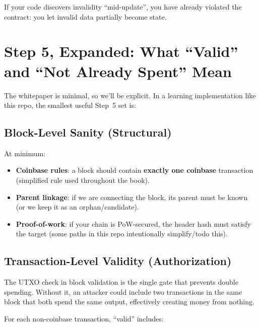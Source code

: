 If your code discovers invalidity ``mid-update'', you have already violated the contract: you let invalid data partially become state.

\section{Step 5, Expanded: What ``Valid'' and ``Not Already Spent'' Mean}
\label{sec:ch10-what-valid-means}

The whitepaper is minimal, so we'll be explicit. In a learning implementation like this repo, the smallest useful Step~5 set is:

\subsection{Block-Level Sanity (Structural)}
\label{sec:ch10-structural}

At minimum:

\begin{itemize}
  \item \textbf{Coinbase rules}: a block should contain \textbf{exactly one coinbase} transaction (simplified rule used throughout the book).
  \item \textbf{Parent linkage}: if we are connecting the block, its parent must be known (or we keep it as an orphan/candidate).
  \item \textbf{Proof-of-work}: if your chain is PoW-secured, the header hash must satisfy the target (some paths in this repo intentionally simplify/todo this).
\end{itemize}

\subsection{Transaction-Level Validity (Authorization)}
\label{sec:ch10-authorization}

\begin{warnbox}
The UTXO check in block validation is the single gate that prevents double spending. Without it, an attacker could include two transactions in the same block that both spend the same output, effectively creating money from nothing.
\end{warnbox}

For each non-coinbase transaction, ``valid'' includes:


